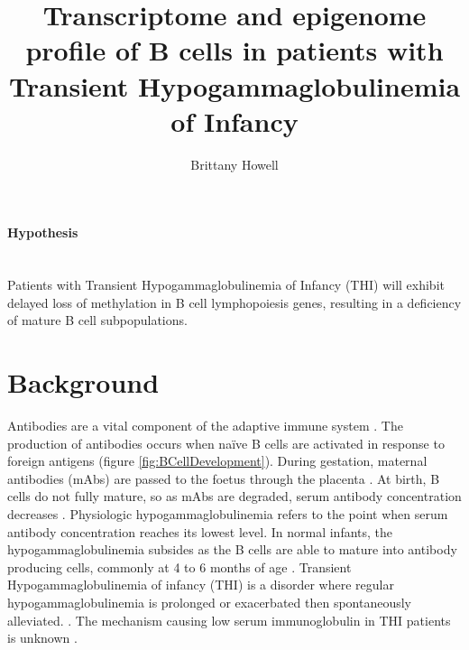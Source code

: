 \documentclass[12pt]{article}
\title{\vspace{-2cm} Transcriptome and epigenome profile of B cells in patients with Transient Hypogammaglobulinemia of Infancy}
\date{}
\author{Brittany Howell}
\newcommand{\naive}{na\"{i}ve }
\begin{document}
	\maketitle
	
	\paragraph{Hypothesis}
	~\\
	Patients with Transient Hypogammaglobulinemia of Infancy (THI) will exhibit delayed loss of methylation in B cell lymphopoiesis genes, resulting in a deficiency of mature B cell subpopulations.
	
	\section{Background}
		
		Antibodies are a vital component of the adaptive immune system \citep{Simon15}. 
		The production of antibodies occurs when \naive B cells are activated in response to foreign antigens (figure \ref{fig:BCellDevelopment}).
		During gestation, maternal antibodies (mAbs) are passed to the foetus through the placenta \citep{Hasselquist09}.
		At birth, B cells do not fully mature, so as mAbs are degraded, serum antibody concentration decreases \citep{Martin10,Rechavi15}. 
		Physiologic hypogammaglobulinemia refers to the point when serum antibody concentration reaches its lowest level.
		In normal infants, the hypogammaglobulinemia subsides as the B cells are able to mature into antibody producing cells, commonly at 4 to 6 months of age \citep{Dressler89}. 
		Transient Hypogammaglobulinemia of infancy (THI) is a disorder where regular hypogammaglobulinemia is prolonged or exacerbated then spontaneously alleviated. \citep{Dressler89,AlHerz14,Gitlin56,AlHerz11,Rosen66,McGeady87,Stiemh80, Dalal98,Tiller78,Buckley83}.
		The mechanism causing low serum immunoglobulin in THI patients is unknown \citep{AlHerz14}. 

			
\end{document}

